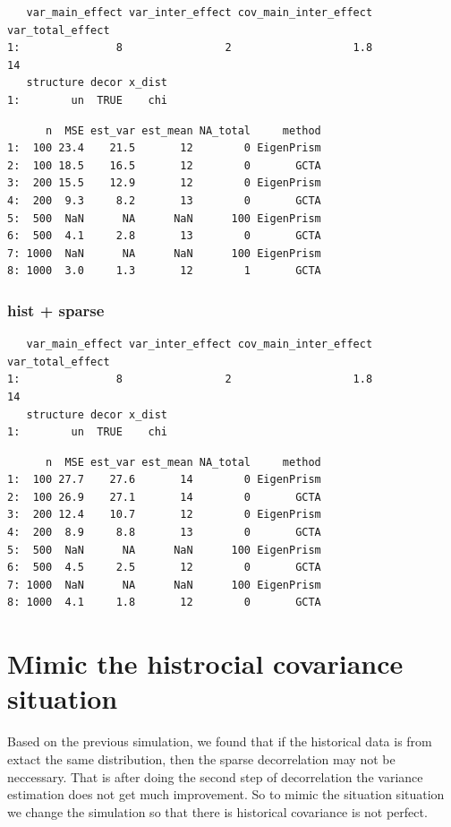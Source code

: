\documentclass[]{article}
\begin{document}
\begin{verbatim}
   var_main_effect var_inter_effect cov_main_inter_effect var_total_effect
1:               8                2                   1.8               14
   structure decor x_dist
1:        un  TRUE    chi
\end{verbatim}

\begin{verbatim}
      n  MSE est_var est_mean NA_total     method
1:  100 23.4    21.5       12        0 EigenPrism
2:  100 18.5    16.5       12        0       GCTA
3:  200 15.5    12.9       12        0 EigenPrism
4:  200  9.3     8.2       13        0       GCTA
5:  500  NaN      NA      NaN      100 EigenPrism
6:  500  4.1     2.8       13        0       GCTA
7: 1000  NaN      NA      NaN      100 EigenPrism
8: 1000  3.0     1.3       12        1       GCTA
\end{verbatim}

\subsubsection{hist + sparse}\label{hist-sparse-1}

\begin{verbatim}
   var_main_effect var_inter_effect cov_main_inter_effect var_total_effect
1:               8                2                   1.8               14
   structure decor x_dist
1:        un  TRUE    chi
\end{verbatim}

\begin{verbatim}
      n  MSE est_var est_mean NA_total     method
1:  100 27.7    27.6       14        0 EigenPrism
2:  100 26.9    27.1       14        0       GCTA
3:  200 12.4    10.7       12        0 EigenPrism
4:  200  8.9     8.8       13        0       GCTA
5:  500  NaN      NA      NaN      100 EigenPrism
6:  500  4.5     2.5       12        0       GCTA
7: 1000  NaN      NA      NaN      100 EigenPrism
8: 1000  4.1     1.8       12        0       GCTA
\end{verbatim}

\section{Mimic the histrocial covariance
situation}\label{mimic-the-histrocial-covariance-situation}

Based on the previous simulation, we found that if the historical data
is from extact the same distribution, then the sparse decorrelation may
not be neccessary. That is after doing the second step of decorrelation
the variance estimation does not get much improvement. So to mimic the
situation situation we change the simulation so that there is historical
covariance is not perfect.
\end{document}
